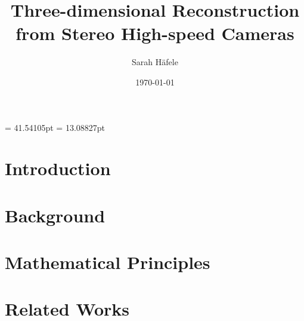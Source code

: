 

\evensidemargin = 41.54105pt
\oddsidemargin  = 13.08827pt


\presentdate{\today}						%
{}					%

\author{Sarah Häfele}
\title{Three-dimensional Reconstruction from Stereo High-speed Cameras}
\subject{Master-Thesis}
\publishers{Hochschule Furtwangen\\Fakultät Digitale Medien}
\date{\today}


\frontmatter

\maketitle					%
\clearpage
\clearpage
\tableofcontents			%

\mainmatter
\chapter{Introduction}\label{c:Intro}

\chapter{Background}
			
\chapter{Mathematical Principles}

\chapter{Related Works}

